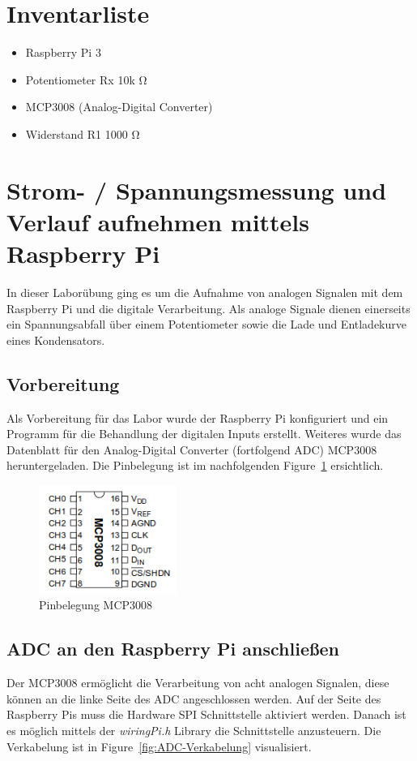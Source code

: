 \documentclass{article}
\begin{document}
\tableofcontents

\section{Inventarliste}
  \begin{itemize}
    \item Raspberry Pi 3
    \item Potentiometer Rx 10k \si{\ohm}
    \item MCP3008 (Analog-Digital Converter)
    \item Widerstand R1 1000 \si{\ohm}
  \end{itemize}

\newpage
\section{Strom- / Spannungsmessung und Verlauf aufnehmen mittels Raspberry Pi}
In dieser Laborübung ging es um die Aufnahme von analogen Signalen mit dem Raspberry Pi und die digitale Verarbeitung. 
Als analoge Signale dienen einerseits ein Spannungsabfall über einem Potentiometer sowie die Lade\- und Entladekurve eines Kondensators.

\subsection{Vorbereitung}
Als Vorbereitung für das Labor wurde der Raspberry Pi konfiguriert und ein Programm für die Behandlung der digitalen Inputs erstellt.
Weiteres wurde das Datenblatt für den Analog-Digital Converter (fortfolgend ADC) MCP3008 heruntergeladen. 
Die Pinbelegung ist im nachfolgenden Figure~\ref{fig:ADCPinbelegung} ersichtlich.

\begin{figure}[h!]
    \centering
    \includegraphics[width=0.4\textwidth]{MCP3008-Pinbelegung.png}
    \caption{Pinbelegung MCP3008}
    \label{fig:ADCPinbelegung}
\end{figure}

\newpage
\subsection{ADC an den Raspberry Pi anschließen}
Der MCP3008 ermöglicht die Verarbeitung von acht analogen Signalen, diese können an die linke Seite des ADC angeschlossen werden.
Auf der Seite des Raspberry Pis muss die Hardware SPI Schnittstelle aktiviert werden. Danach ist es möglich mittels der \textit{wiringPi.h} Library die Schnittstelle anzusteuern.
Die Verkabelung ist in Figure~\ref{fig:ADC-Verkabelung} visualisiert.
\end{document}
